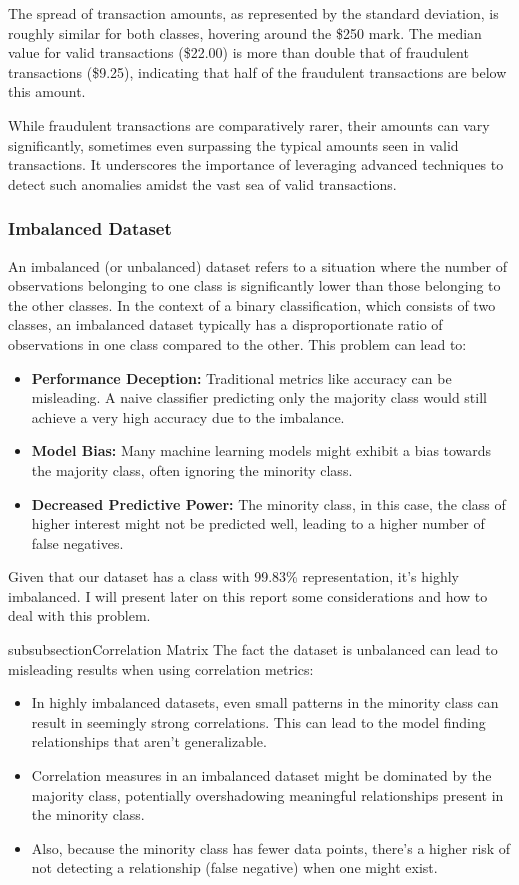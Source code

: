 The spread of transaction amounts, as represented by the standard deviation, is roughly similar for both classes, hovering around the \$250 mark. The median value for valid transactions (\$22.00) is more than double that of fraudulent transactions (\$9.25), indicating that half of the fraudulent transactions are below this amount.

While fraudulent transactions are comparatively rarer, their amounts can vary significantly, sometimes even surpassing the typical amounts seen in valid transactions. It underscores the importance of leveraging advanced techniques to detect such anomalies amidst the vast sea of valid transactions.

\sub

\subsubsection{Imbalanced Dataset}

An imbalanced (or unbalanced) dataset refers to a situation where the number of observations belonging to one class is significantly lower than those belonging to the other classes. In the context of a binary classification, which consists of two classes, an imbalanced dataset typically has a disproportionate ratio of observations in one class compared to the other.
This problem can lead to:
\begin{itemize}
    \item \textbf{Performance Deception:} Traditional metrics like accuracy can be misleading. A naive classifier predicting only the majority class would still achieve a very high accuracy due to the imbalance.
    \item \textbf{Model Bias:} Many machine learning models might exhibit a bias towards the majority class, often ignoring the minority class.
    \item \textbf{Decreased Predictive Power:} The minority class, in this case, the class of higher interest might not be predicted well, leading to a higher number of false negatives.
\end{itemize}

Given that our dataset has a class with 99.83\% representation, it's highly imbalanced. I will present later on this report some considerations and how to deal with this problem.

subsubsection{Correlation Matrix}
The fact the dataset is unbalanced can lead to misleading results when using correlation metrics:
\begin{itemize}
    \item In highly imbalanced datasets, even small patterns in the minority class can result in seemingly strong correlations. This can lead to the model finding relationships that aren't generalizable.
    \item Correlation measures in an imbalanced dataset might be dominated by the majority class, potentially overshadowing meaningful relationships present in the minority class.
    \item Also, because the minority class has fewer data points, there's a higher risk of not detecting a relationship (false negative) when one might exist.
\end{itemize}

